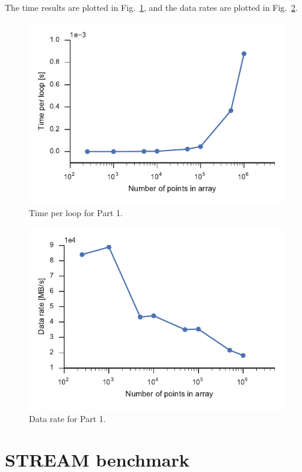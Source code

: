 \documentclass{article}
\begin{document}
The time results are plotted in Fig.~\ref{fig:p1time}, and the data rates are plotted in Fig.~\ref{fig:p1rate}.

\begin{figure}
    \centering
    \includegraphics{p1time.pdf}
    \caption{Time per loop for Part 1.}
    \label{fig:p1time}
\end{figure}
\begin{figure}
    \centering
    \includegraphics{p1rate.pdf}
    \caption{Data rate for Part 1.}
    \label{fig:p1rate}
\end{figure}

\section{STREAM benchmark}
\end{document}
